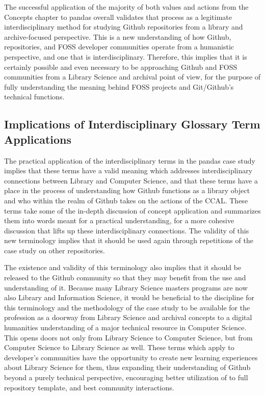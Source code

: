 The successful application of the majority of both values and actions from the Concepts chapter to pandas overall validates that process as a legitimate interdisciplinary method for studying Github repositories from a library and archive-focused perspective. This is a new understanding of how Github, repositories, and FOSS developer communities operate from a humanistic perspective, and one that is interdisciplinary. Therefore, this implies that it is certainly possible and even necessary to be approaching Github and FOSS communities from a Library Science and archival point of view, for the purpose of fully understanding the meaning behind FOSS projects and Git/Github's technical functions. 

\subsection{Implications of Interdisciplinary Glossary Term Applications}

The practical application of the interdisciplinary terms in the pandas case study implies that these terms have a valid meaning which addresses interdisciplinary connections between Library and Computer Science, and that these terms have a place in the process of understanding how Github functions as a library object and who within the realm of Github takes on the actions of the CCAL. These terms take some of the in-depth discussion of concept application and summarizes them into words meant for a practical understanding, for a more cohesive discussion that lifts up these interdisciplinary connections. The validity of this new terminology implies that it should be used again through repetitions of the case study on other repositories. 

The existence and validity of this terminology also implies that it should be released to the Github community so that they may benefit from the use and understanding of it. Because many Library Science masters programs are now also Library and Information Science, it would be beneficial to the discipline for this terminology and the methodology of the case study to be available for the profession as a doorway from Library Science and archival concepts to a digital humanities understanding of a major technical resource in Computer Science. This opens doors not only from Library Science to Computer Science, but from Computer Science to Library Science as well. These terms which apply to developer's communities have the opportunity to create new learning experiences about Library Science for them, thus expanding their understanding of Github beyond a purely technical perspective, encouraging better utilization of to full repository template, and best community interactions.

